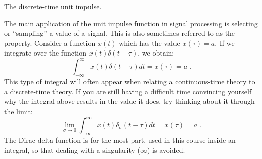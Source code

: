 \begin{marginfigure}
\begin{center}
\end{center}
\caption{The discrete-time unit impulse.}
\label{fig:udensdisc}
\end{marginfigure}

The main application of the unit impulse function in signal processing is selecting or ``sampling'' a value of a signal. This is also sometimes referred to as the \emph{} property. 
Consider a function $x(t)$ which has the value $x(\tau) = a$. If we integrate over the function $x(t)\delta(t-\tau)$, we obtain:
\begin{equation}
\int_{-\infty}^{\infty}x(t)\delta(t-\tau) dt = x(\tau) = a\,\,.
\end{equation}
This type of integral will often appear when relating a continuous-time theory to a discrete-time theory. 
If you are still having a difficult time convincing yourself why the integral above results in the value it does, try thinking about it through the limit:
\begin{equation}
\lim_{\sigma\rightarrow 0}\int_{-\infty}^{\infty}x(t)\delta_{\sigma}(t-\tau) dt = x(\tau) = a\,\,.
\end{equation}
The Dirac delta function is for the most part, used in this course inside an integral, so that dealing with a singularity ($\infty$) is avoided.

